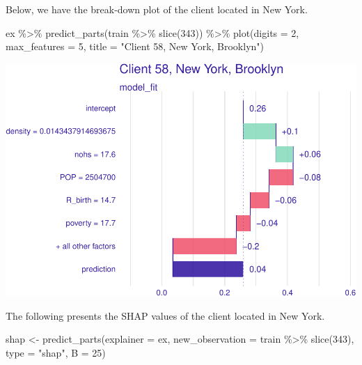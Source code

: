 \documentclass[
]{article}
\newenvironment{Shaded}{\begin{snugshade}}{\end{snugshade}}
\newcommand{\AttributeTok}[1]{\textcolor[rgb]{0.77,0.63,0.00}{#1}}
\newcommand{\DecValTok}[1]{\textcolor[rgb]{0.00,0.00,0.81}{#1}}
\newcommand{\FunctionTok}[1]{\textcolor[rgb]{0.00,0.00,0.00}{#1}}
\newcommand{\NormalTok}[1]{#1}
\newcommand{\OtherTok}[1]{\textcolor[rgb]{0.56,0.35,0.01}{#1}}
\newcommand{\SpecialCharTok}[1]{\textcolor[rgb]{0.00,0.00,0.00}{#1}}
\newcommand{\StringTok}[1]{\textcolor[rgb]{0.31,0.60,0.02}{#1}}
\begin{document}
Below, we have the break-down plot of the client located in New York.

\begin{Shaded}
\begin{Highlighting}[]
\NormalTok{ex }\SpecialCharTok{\%\textgreater{}\%}
  \FunctionTok{predict\_parts}\NormalTok{(train }\SpecialCharTok{\%\textgreater{}\%} \FunctionTok{slice}\NormalTok{(}\DecValTok{343}\NormalTok{)) }\SpecialCharTok{\%\textgreater{}\%}
  \FunctionTok{plot}\NormalTok{(}\AttributeTok{digits =} \DecValTok{2}\NormalTok{, }\AttributeTok{max\_features =} \DecValTok{5}\NormalTok{, }\AttributeTok{title =} \StringTok{"Client 58, New York, Brooklyn"}\NormalTok{)}
\end{Highlighting}
\end{Shaded}

\includegraphics{figures/report/fig-unnamed-chunk-30-1.pdf}

The following presents the SHAP values of the client located in New
York.

\begin{Shaded}
\begin{Highlighting}[]
\NormalTok{shap }\OtherTok{\textless{}{-}} \FunctionTok{predict\_parts}\NormalTok{(}\AttributeTok{explainer =}\NormalTok{ ex,}
                      \AttributeTok{new\_observation =}\NormalTok{ train }\SpecialCharTok{\%\textgreater{}\%} \FunctionTok{slice}\NormalTok{(}\DecValTok{343}\NormalTok{),}
                                 \AttributeTok{type =} \StringTok{"shap"}\NormalTok{,}
                                  \AttributeTok{B =} \DecValTok{25}\NormalTok{)}
\end{Highlighting}
\end{Shaded}
\end{document}
